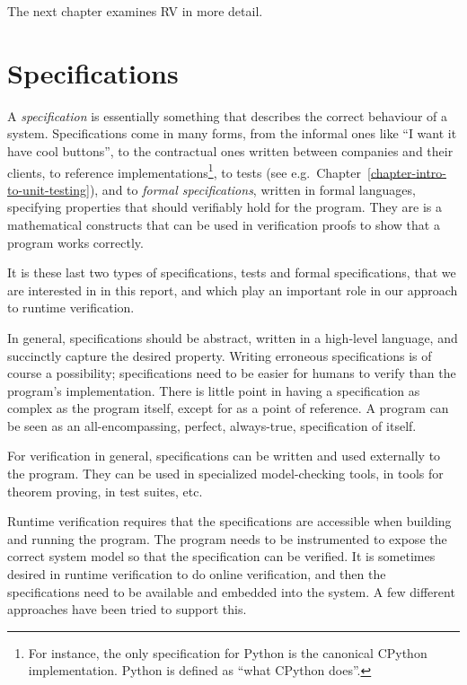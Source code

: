 The next chapter examines RV in more detail.


\section{Specifications} \label{section-specifications}

A \textit{specification} is essentially something that describes the correct
behaviour of a system. Specifications come in many forms, from the informal
ones like ``I want it have cool buttons'', to the contractual ones written
between companies and their clients, to reference implementations\footnote{For
instance, the only specification for Python is the canonical CPython
implementation. Python is defined as ``what CPython does''.}, to tests (see
e.g.\ Chapter~\ref{chapter-intro-to-unit-testing}), and to \textit{formal
specifications}, written in formal languages, specifying properties that should
verifiably hold for the program. They are is a mathematical constructs that can
be used in verification proofs to show that a program works correctly.

It is these last two types of specifications, tests and formal specifications,
that we are interested in in this report, and which play an important role in
our approach to runtime verification.

In general, specifications should be abstract, written in a high-level
language, and succinctly capture the desired property. Writing erroneous
specifications is of course a possibility; specifications need to be easier for
humans to verify than the program's implementation. There is little point in
having a specification as complex as the program itself, except for as a point
of reference. A program can be seen as an all-encompassing, perfect,
always-true, specification of itself.

For verification in general, specifications can be written and used externally
to the program. They can be used in specialized model-checking tools, in tools
for theorem proving, in test suites, etc.

Runtime verification requires that the specifications are accessible when
building and running the program. The program needs to be instrumented to
expose the correct system model so that the specification can be verified. It
is sometimes desired in runtime verification to do online verification, and
then the specifications need to be available and embedded into the system. A
few different approaches have been tried to support this.

